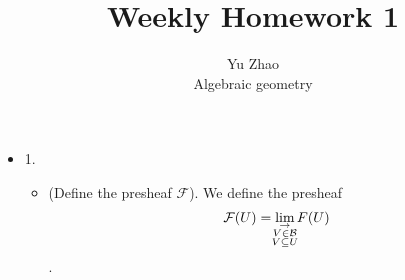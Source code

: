 \documentclass[11pt]{article}
\begin{document}



 
 
\title{Weekly Homework 1}%
\author{Yu Zhao\\ %
Algebraic geometry} %
 
\maketitle
\begin{itemize}
\item 1.
  \begin{itemize}
  \item (Define the presheaf $\mathcal{F}$). We define the presheaf 
    $$\mathcal{F}(U)=\lim_{\mathclap {\substack{\rightarrow \\V \in \mathcal{B} \\ V \subseteq U}}} F(U)$$.


\end{itemize}
\end{itemize}
\end{document}

